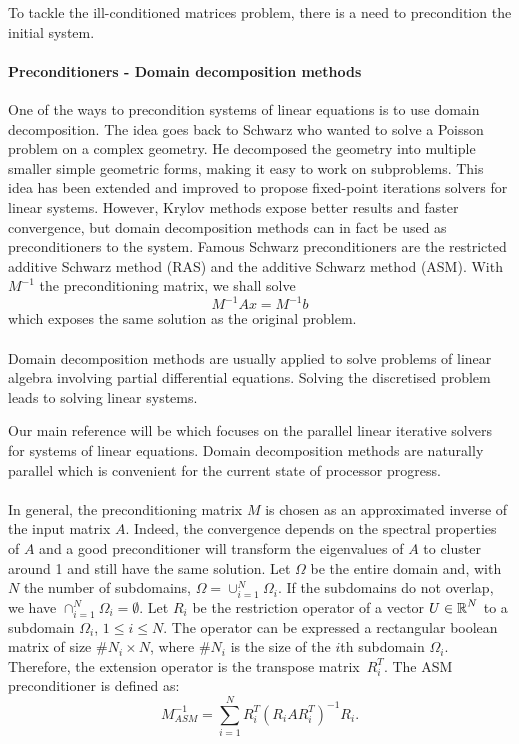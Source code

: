To tackle the ill-conditioned matrices problem, there is a need to precondition the initial system.


\paragraph{Preconditioners - Domain decomposition methods}
One of the ways to precondition systems of linear equations is to use domain decomposition.
The idea goes back to Schwarz who wanted to solve a Poisson problem on a complex geometry.
He decomposed the geometry into multiple smaller simple geometric forms, making it easy to work on subproblems.
This idea has been extended and improved to propose fixed-point iterations solvers for linear systems.
However, Krylov methods expose better results and faster convergence, but domain decomposition methods can in fact be used as preconditioners to the system.
Famous Schwarz preconditioners are the restricted additive Schwarz method (RAS) and the additive Schwarz method (ASM).
With \(M^{-1}\) the preconditioning matrix, we shall solve
\[M^{-1}Ax = M^{-1}b\]
which exposes the same solution as the original problem.

\paragraph{}
Domain decomposition methods are usually applied to solve problems of linear algebra involving partial differential equations.
Solving the discretised problem leads to solving linear systems.

Our main reference will be \cite{dolean_domain_2015} which focuses on the parallel linear iterative solvers for systems of linear equations.
Domain decomposition methods are naturally parallel which is convenient for the current state of processor progress.

\paragraph{}
In general, the preconditioning matrix \(M\) is chosen as an approximated inverse of the input matrix \(A\).
Indeed, the convergence depends on the spectral properties of \(A\) and a good preconditioner will transform the eigenvalues of \(A\) to cluster around 1 and still have the same solution.
Let \(\Omega\) be the entire domain and, with \(N\) the number of subdomains, \(\Omega = \cup^N_{i=1} \Omega_i\).
If the subdomains do not overlap, we have \(\cap^N_{i=1} \Omega_i = \emptyset\).
Let \(R_i\) be the restriction operator of a vector \(U \in \operatorname{\mathbb{R}}^N\) to a subdomain \(\Omega_i\), \(1 \le i \le N\).
The operator can be expressed a rectangular boolean matrix of size \(\#N_i \times N\), where \(\#N_i\) is the size of the \(i\)th subdomain \(\Omega_i\).
Therefore, the extension operator is the transpose matrix \(R_i^T\).
The ASM preconditioner is defined as:
\[M^{-1}_{ASM} = \sum^N_{i=1} R_i^T (R_i A R_i^T)^{-1} R_i.\]

